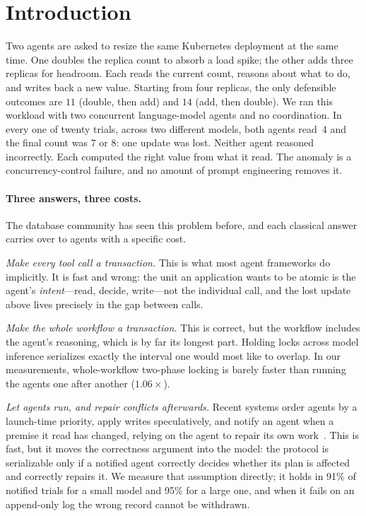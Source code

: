 \section{Introduction}
\label{sec:intro}

Two agents are asked to resize the same Kubernetes deployment at the same
time. One doubles the replica count to absorb a load spike; the other adds
three replicas for headroom. Each reads the current count, reasons about what
to do, and writes back a new value. Starting from four replicas, the only
defensible outcomes are $11$ (double, then add) and $14$ (add, then double).
We ran this workload with two concurrent language-model agents and no
coordination. In every one of twenty trials, across two different models, both
agents read~$4$ and the final count was $7$ or $8$: one update was lost.
Neither agent reasoned incorrectly. Each computed the right value from what it
read. The anomaly is a concurrency-control failure, and no amount of prompt
engineering removes it.

\paragraph{Three answers, three costs.}
The database community has seen this problem before, and each classical answer
carries over to agents with a specific cost.

\emph{Make every tool call a transaction.} This is what most agent frameworks
do implicitly. It is fast and wrong: the unit an application wants to be
atomic is the agent's \emph{intent}---read, decide, write---not the individual
call, and the lost update above lives precisely in the gap between calls.

\emph{Make the whole workflow a transaction.} This is correct, but the
workflow includes the agent's reasoning, which is by far its longest part.
Holding locks across model inference serializes exactly the interval one
would most like to overlap. In our measurements, whole-workflow two-phase
locking is barely faster than running the agents one after another
($1.06\times$).

\emph{Let agents run, and repair conflicts afterwards.} Recent systems order
agents by a launch-time priority, apply writes speculatively, and notify an
agent when a premise it read has changed, relying on the agent to repair its
own work~\cite{lyu2026coagent}. This is fast, but it moves the correctness
argument into the model: the protocol is serializable only if a notified agent
correctly decides whether its plan is affected and correctly repairs it. We
measure that assumption directly; it holds in 91\% of notified trials for a
small model and 95\% for a large one, and when it fails on an append-only log
the wrong record cannot be withdrawn.

